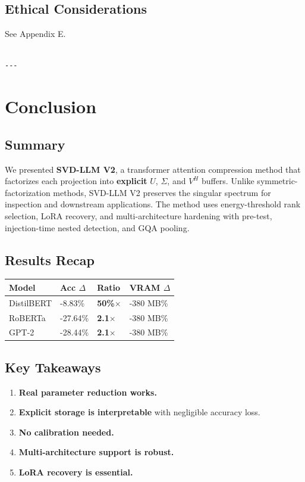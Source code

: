 \subsection{Ethical Considerations}

See Appendix E.
\begin{lstlisting}

---
\end{lstlisting}


\section{Conclusion}

\subsection{Summary}

We presented \textbf{SVD-LLM V2}, a transformer attention compression method that 
factorizes each projection into \textbf{explicit} $U$, $\Sigma$, and $V^H$ 
buffers. Unlike symmetric-factorization methods, SVD-LLM V2 preserves the 
singular spectrum for inspection and downstream applications. The method 
uses energy-threshold rank selection, LoRA recovery, and multi-architecture 
hardening with pre-test, injection-time nested detection, and GQA pooling.

\subsection{Results Recap}

\begin{table}[H]
\centering
\small
\begin{tabular}{llll}
\toprule
\textbf{Model} & \textbf{Acc $\Delta$} & \textbf{Ratio} & \textbf{VRAM $\Delta$} \\
\midrule
DistilBERT & -8.83\% & \textbf{50\%$\times$} & -380 MB\% \\
RoBERTa & -27.64\% & \textbf{2.1$\times$} & -380 MB\% \\
GPT-2 & -28.44\% & \textbf{2.1$\times$} & -380 MB\% \\
\bottomrule
\end{tabular}
\end{table}

\subsection{Key Takeaways}

\begin{enumerate}
\item \textbf{Real parameter reduction works.}
\item \textbf{Explicit storage is interpretable} with negligible accuracy loss.
\item \textbf{No calibration needed.}
\item \textbf{Multi-architecture support is robust.}
\item \textbf{LoRA recovery is essential.}

\end{enumerate}
